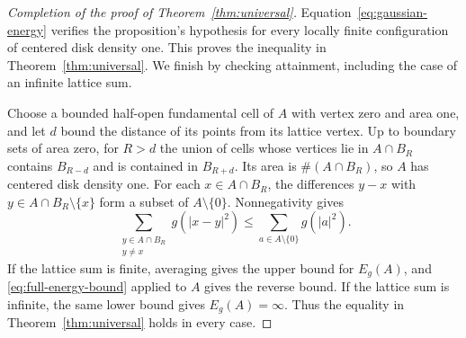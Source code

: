 \begin{proof}[Completion of the proof of Theorem~\ref{thm:universal}]
Equation~\eqref{eq:gaussian-energy} verifies the proposition's hypothesis
for every locally finite configuration of centered disk density one.  This
proves the inequality in Theorem~\ref{thm:universal}.  We finish by checking
attainment, including the case of an infinite lattice sum.

Choose a bounded half-open fundamental cell of $A$ with vertex zero and area one, and let
$d$ bound the distance of its points from its lattice vertex.  Up to boundary
sets of area zero, for $R>d$ the union of cells whose vertices lie in $A\cap B_R$
contains $B_{R-d}$ and is contained in $B_{R+d}$.  Its area is
$\#(A\cap B_R)$, so $A$ has centered disk density one.  For each
$x\in A\cap B_R$, the differences $y-x$ with
$y\in A\cap B_R\setminus\{x\}$ form a subset of $A\setminus\{0\}$.
Nonnegativity gives
\[
 \sum_{\substack{y\in A\cap B_R\\y\ne x}}g(|x-y|^2)
 \le\sum_{a\in A\setminus\{0\}}g(|a|^2).
\]
If the lattice sum is finite, averaging gives the upper bound for $E_g(A)$,
and \eqref{eq:full-energy-bound} applied to $A$ gives the reverse bound.
If the lattice sum is infinite, the same lower bound gives $E_g(A)=\infty$.
Thus the equality in Theorem~\ref{thm:universal} holds in every case.
\end{proof}
